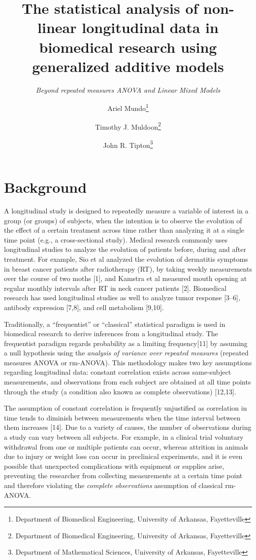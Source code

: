 \documentclass[
]{article}
\title{\textbf{The statistical analysis of non-linear longitudinal data in biomedical research using generalized additive models}}
\subtitle{\emph{Beyond repeated measures ANOVA and Linear Mixed Models}}
\author{Ariel Mundo\footnote{Department of Biomedical Engineering, University of Arkansas, Fayetteville} \and Timothy J. Muldoon\footnote{Department of Biomedical Engineering, University of Arkansas, Fayetteville} \and John R. Tipton\footnote{Department of Mathematical Sciences, University of Arkansas, Fayetteville}}
\date{}
\begin{document}
\maketitle

{
\setcounter{tocdepth}{2}
\tableofcontents
}
\hypertarget{background}{%
\section{Background}\label{background}}

A longitudinal study is designed to repeatedly measure a variable of interest in a group (or groups) of subjects, when the intention is to observe the evolution of the effect of a certain treatment across time rather than analyzing it at a single time point (e.g., a cross-sectional study). Medical research commonly uses longitudinal studies to analyze the evolution of patients before, during and after treatment. For example, Sio et al analyzed the evolution of dermatitis symptoms in breast cancer patients after radiotherapy (RT), by taking weekly measurements over the course of two moths {[}1{]}, and Kamstra et al measured mouth opening at regular monthly intervals after RT in neck cancer patients {[}2{]}. Biomedical research has used longitudinal studies as well to analyze tumor response {[}3--6{]}, antibody expression {[}7,8{]}, and cell metabolism {[}9,10{]}.

Traditionally, a ``frequentist'' or ``classical'' statistical paradigm is used in biomedical research to derive inferences from a longitudinal study. The frequentist paradigm regards probability as a limiting frequency{[}11{]} by assuming a null hypothesis using the \emph{analysis of variance over repeated measures} (repeated measures ANOVA or rm-ANOVA). This methodology makes two key assumptions regarding longitudinal data: constant correlation exists across same-subject measurements, and observations from each subject are obtained at all time points through the study (a condition also known as complete observations) {[}12,13{]}.

The assumption of constant correlation is frequently unjustified as correlation in time tends to diminish between measurements when the time interval between them increases {[}14{]}.
Due to a variety of causes, the number of observations during a study can vary between all subjects. For example, in a clinical trial voluntary withdrawal from one or multiple patients can occur, whereas attrition in animals due to injury or weight loss can occur in preclinical experiments, and it is even possible that unexpected complications with equipment or supplies arise, preventing the researcher from collecting measurements at a certain time point and therefore violating the \emph{complete observations} assumption of classical rm-ANOVA.
\end{document}
